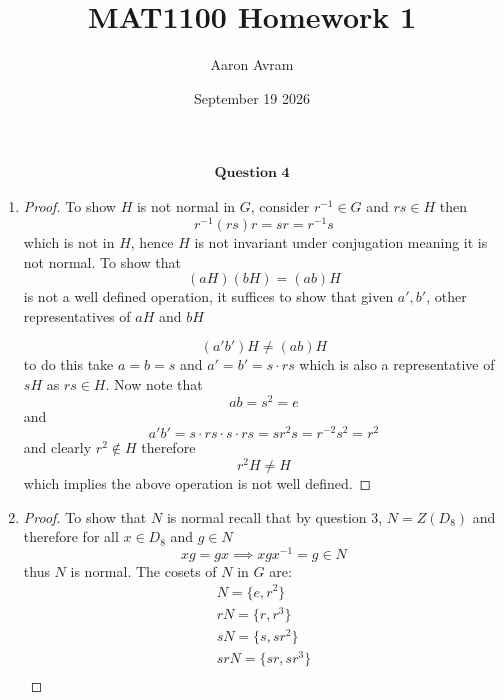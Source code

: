\documentclass[12pt]{article}
\title{MAT1100 Homework 1}
\author{Aaron Avram}
\date{September 19 2026}
\begin{document}
\newtheorem{definition}{Definition}
\newtheorem{theorem}{Theorem}
\newtheorem{claim}{Claim}
\newtheorem{corollary}{Corollary}

\maketitle

\begin{align*}
    \textbf{Question 4}
\end{align*}
\begin{enumerate}
    \item[(a)]
    \begin{proof}
        To show $H$ is not normal in $G$, consider $r^{-1} \in G$ and $rs \in H$
        then
        \[ r^{-1}(rs)r = sr = r^{-1}s \]
        which is not in $H$, hence $H$ is not invariant under conjugation meaning it is not normal.
        To show that 
        \[ (aH)(bH) = (ab)H \]
        is not a well defined operation, it suffices to show that given $a', b'$, other representatives of $aH$ and $bH$
        
        \[ (a'b')H \neq (ab)H \]
        to  do this take $a = b = s$ and $a' = b' = s \cdot rs$ which is also a representative of $sH$
        as $rs \in H$. Now note that
        \[ ab = s^2 = e \]
        and
        \[ a'b' = s \cdot rs \cdot s \cdot rs = sr^2s = r^{-2}s^2 = r^2 \]
        and clearly $r^2 \notin H$ therefore
        \[ r^2H \neq H \]
        which implies the above operation is not well defined.
    \end{proof}

    \item[(b)]
    \begin{proof}
        To show that $N$ is normal recall that by question $3$, $N = Z(D_8)$
        and therefore for all $x \in D_8$ and $g \in N$
        \[ xg = gx \implies xgx^{-1} = g \in N \]
        thus $N$ is normal.
        The cosets of $N$ in $G$ are:
        \begin{align*}
            N = \{ e, r^2 \} \\
            rN = \{ r, r^3 \} \\
            sN = \{ s, sr^2 \} \\
            srN = \{ sr, sr^3 \} \\
        \end{align*}
    \end{proof}


\end{enumerate}
\end{document}
